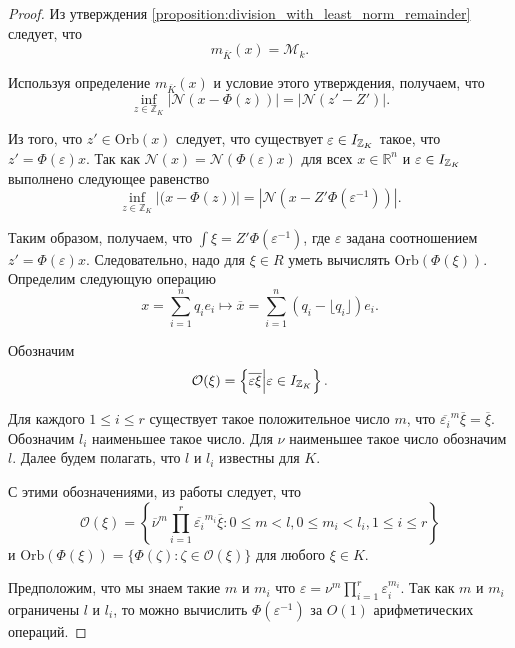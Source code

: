 \documentclass[_00_dissertation.tex]{subfiles}
\begin{document}
\begin{proof}
    Из утверждения \ref{proposition:division_with_least_norm_remainder} следует, что
    \begin{equation*}
        m_{\overline{K}}(x) = \mathcal{M}_k.
    \end{equation*}
    
    Используя определение $m_{\overline{K}}(x)$ и условие этого утверждения, получаем, что
    \begin{equation*}
        \inf\limits_{z \in \mathbb{Z}_K} |\mathcal{N}(x - \Phi(z))| = |\mathcal{N}(z' - Z')|.
    \end{equation*}

    Из того, что $z' \in \textrm{Orb}(x)$ следует, что существует $\varepsilon \in I_{\mathbb{Z}_K}$ такое, что $z' = \Phi(\varepsilon)x$.
    Так как $\mathcal{N}(x) = \mathcal{N}(\Phi(\varepsilon)x)$ для всех $x \in \mathbb{R}^n$ и $\varepsilon \in I_{\mathbb{Z}_K}$ выполнено следующее равенство
    \begin{equation*}
        \inf\limits_{z \in \mathbb{Z}_K} |\mathcal(x - \Phi(z))| = |\mathcal{N}(x - Z'\Phi(\varepsilon^{-1}))|.
    \end{equation*}

    Таким образом, получаем, что $\int{\xi} = Z'\Phi(\varepsilon^{-1})$, где $\varepsilon$ задана соотношением $z' = \Phi(\varepsilon)x$.
    Следовательно, надо для $\xi \in R$ уметь вычислять $\textrm{Orb}(\Phi(\xi))$.
    Определим следующую операцию
    \begin{equation*}
        x = \sum\limits_{i=1}^n q_i e_i \longmapsto \overline{x} = \sum\limits_{i=1}^n (q_i - \lfloor q_i \rfloor)e_i.
    \end{equation*}
    
    Обозначим
    \begin{equation*}
        \mathcal{O}(\xi) = \left\{
            \overline{\varepsilon\xi} \Big| \varepsilon \in I_{\mathbb{Z}_K}
    	\right\}.
    \end{equation*}
    
    Для каждого $1 \le i \le r$ существует такое положительное число $m$, что $\overline{\varepsilon_i}^m\overline{\xi} = \overline{\xi}$.
    Обозначим $l_i$ наименьшее такое число.
    Для $\nu$ наименьшее такое число обозначим $l$.
    Далее будем полагать, что $l$ и $l_i$ известны для $K$.
    
    С этими обозначениями, из работы \cite{source:Lezowski} следует, что
    \begin{equation*}
        \mathcal{O}(\xi) = \left\{
            \overline{\nu}^m \prod\limits_{i=1}^r \overline{\varepsilon_i}^{m_i} \overline{\xi}:
                0 \le m < l, 0 \le m_i < l_i, 1 \le i \le r
        \right\}
    \end{equation*}
    и $\textrm{Orb}(\Phi(\xi)) = \{\Phi(\zeta):\zeta \in \mathcal{O}(\xi)\}$ для любого $\xi\in K$.

    Предположим, что мы знаем такие $m$ и $m_i$ что $\varepsilon = \nu^m\prod_{i=1}^r \varepsilon_i^{m_i}$.
    Так как $m$ и $m_i$ ограничены $l$ и $l_i$, то можно вычислить $\Phi(\varepsilon^{-1})$ за $O(1)$ арифметических операций.
\end{proof}
\end{document}
